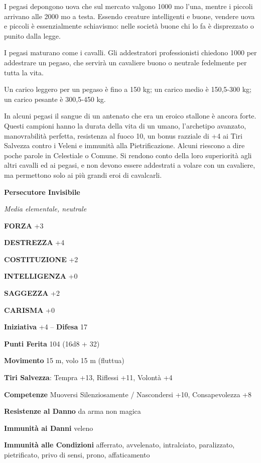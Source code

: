 \begin{multicols}{2}
I pegasi depongono uova che sul mercato valgono 1000 mo l'una, mentre i piccoli arrivano alle 2000 mo a testa. Essendo creature intelligenti e buone, vendere uova e piccoli è essenzialmente schiavismo: nelle società buone chi lo fa è disprezzato o punito dalla legge.

I pegasi maturano come i cavalli. Gli addestratori professionisti chiedono 1000 per addestrare un pegaso, che servirà un cavaliere buono o neutrale fedelmente per tutta la vita.

Un carico leggero per un pegaso è fino a 150 kg; un carico medio è 150,5-300 kg; un carico pesante è 300,5-450 kg.

In alcuni pegasi il sangue di un antenato che era un eroico stallone è ancora forte. Questi campioni hanno la durata della vita di un umano, l'archetipo avanzato, manovrabilità perfetta, resistenza al fuoco 10, un bonus razziale di +4 ai Tiri Salvezza contro i Veleni e immunità alla Pietrificazione. Alcuni riescono a dire poche parole in Celestiale o Comune. Si rendono conto della loro superiorità agli altri cavalli ed ai pegasi, e non devono essere addestrati a volare con un cavaliere, ma permettono solo ai più grandi eroi di cavalcarli.


\medskip{}\textbf{Persecutore Invisibile}

\textit{Media elementale, neutrale}

\textbf{FORZA} +3

\textbf{DESTREZZA} +4

\textbf{COSTITUZIONE} +2

\textbf{INTELLIGENZA} +0

\textbf{SAGGEZZA} +2

\textbf{CARISMA} +0

\textbf{Iniziativa} +4 -- \textbf{Difesa} 17

\textbf{Punti Ferita} 104 (16d8 + 32)

\textbf{Movimento} 15 m, volo 15 m (fluttua)

\textbf{Tiri Salvezza}: Tempra +13, Riflessi +11, Volontà +4

\textbf{Competenze} Muoversi Silenziosamente / Nascondersi +10, Consapevolezza +8

\textbf{Resistenze al Danno} da arma non magica

\textbf{Immunità ai Danni} veleno

\textbf{Immunità alle Condizioni} afferrato, avvelenato, intralciato, paralizzato, pietrificato, privo di sensi, prono, affaticamento


\end{multicols}
